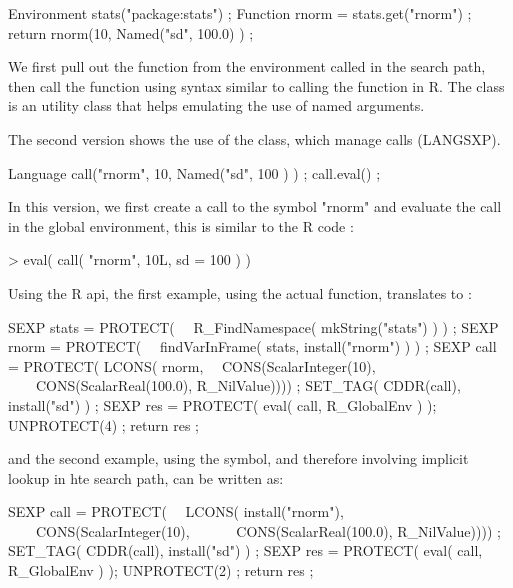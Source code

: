 \begin{example}
Environment stats("package:stats") ;
Function rnorm = stats.get("rnorm") ;
return rnorm(10, Named("sd", 100.0) ) ;
\end{example}

We first pull out the  function from the environment 
called  in the search path, then call the function
using syntax similar to calling the function in R. The  
class is an utility class that helps emulating the use of 
named arguments.

The second version shows the use of the  class, which 
manage calls (LANGSXP). 

\begin{example}
Language call("rnorm", 10, Named("sd", 100 ) ) ;
call.eval() ;
\end{example}


In this version, we first create a call to the symbol "rnorm" and
evaluate the call in the global environment, this is similar to the 
R code : 

\begin{example}
> eval( call( "rnorm", 10L, sd = 100 ) )
\end{example}

Using the R api, the first example, using the actual
 function,
translates to :

\begin{example}
SEXP stats = PROTECT( 
\ \ R_FindNamespace( mkString("stats") ) ) ;
SEXP rnorm = PROTECT( 
\ \ findVarInFrame( stats, install("rnorm") ) ) ;
SEXP call  = PROTECT( LCONS( rnorm, 
\ \ CONS(ScalarInteger(10), 
\ \ \ \ CONS(ScalarReal(100.0), R_NilValue)))) ;
SET_TAG( CDDR(call), install("sd") ) ;
SEXP res = PROTECT( eval( call, R_GlobalEnv ) );
UNPROTECT(4) ;
return res ;
\end{example}

and the second example, using the  symbol, and therefore
involving implicit lookup in hte search path, can be written as:

\begin{example}
SEXP call  = PROTECT( 
\ \ LCONS( install("rnorm"), 
\ \ \ \ CONS(ScalarInteger(10), 
\ \ \ \ \ \ CONS(ScalarReal(100.0), R_NilValue)))) ;
SET_TAG( CDDR(call), install("sd") ) ;
SEXP res = PROTECT( eval( call, R_GlobalEnv ) );
UNPROTECT(2) ;
return res ;
\end{example}



